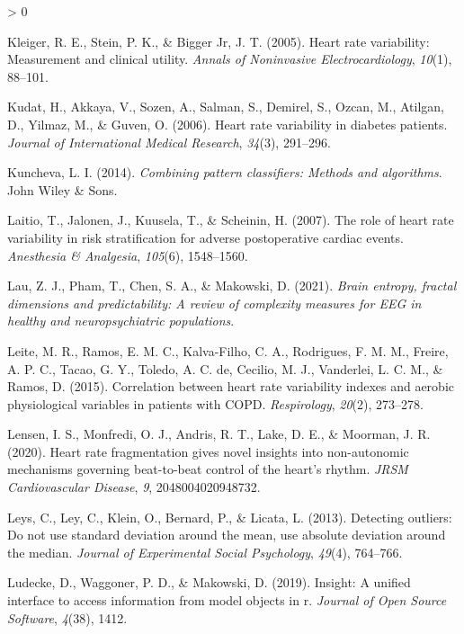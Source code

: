 \documentclass[
  english,
  jou,floatsintext]{apa6}
\newlength{\cslhangindent}
\newenvironment{CSLReferences}[2] %
 {%
  \setlength{\parindent}{0pt}
  \ifodd #1 \everypar{\setlength{\hangindent}{\cslhangindent}}\ignorespaces\fi
  \ifnum #2 > 0
  \setlength{\parskip}{#2\baselineskip}
  \fi
 }%
 {}
\begin{document}
\begin{CSLReferences}{1}{0}
\leavevmode\hypertarget{ref-kleiger2005heart}{}%
Kleiger, R. E., Stein, P. K., \& Bigger Jr, J. T. (2005). Heart rate variability: Measurement and clinical utility. \emph{Annals of Noninvasive Electrocardiology}, \emph{10}(1), 88--101.

\leavevmode\hypertarget{ref-kudat2006heart}{}%
Kudat, H., Akkaya, V., Sozen, A., Salman, S., Demirel, S., Ozcan, M., Atilgan, D., Yilmaz, M., \& Guven, O. (2006). Heart rate variability in diabetes patients. \emph{Journal of International Medical Research}, \emph{34}(3), 291--296.

\leavevmode\hypertarget{ref-kuncheva2014combining}{}%
Kuncheva, L. I. (2014). \emph{Combining pattern classifiers: Methods and algorithms}. John Wiley \& Sons.

\leavevmode\hypertarget{ref-laitio2007role}{}%
Laitio, T., Jalonen, J., Kuusela, T., \& Scheinin, H. (2007). The role of heart rate variability in risk stratification for adverse postoperative cardiac events. \emph{Anesthesia \& Analgesia}, \emph{105}(6), 1548--1560.

\leavevmode\hypertarget{ref-lau2021brain}{}%
Lau, Z. J., Pham, T., Chen, S. A., \& Makowski, D. (2021). \emph{Brain entropy, fractal dimensions and predictability: A review of complexity measures for EEG in healthy and neuropsychiatric populations}.

\leavevmode\hypertarget{ref-leite2015correlation}{}%
Leite, M. R., Ramos, E. M. C., Kalva-Filho, C. A., Rodrigues, F. M. M., Freire, A. P. C., Tacao, G. Y., Toledo, A. C. de, Cecilio, M. J., Vanderlei, L. C. M., \& Ramos, D. (2015). Correlation between heart rate variability indexes and aerobic physiological variables in patients with COPD. \emph{Respirology}, \emph{20}(2), 273--278.

\leavevmode\hypertarget{ref-lensen2020heart}{}%
Lensen, I. S., Monfredi, O. J., Andris, R. T., Lake, D. E., \& Moorman, J. R. (2020). Heart rate fragmentation gives novel insights into non-autonomic mechanisms governing beat-to-beat control of the heart's rhythm. \emph{JRSM Cardiovascular Disease}, \emph{9}, 2048004020948732.

\leavevmode\hypertarget{ref-leys2013detecting}{}%
Leys, C., Ley, C., Klein, O., Bernard, P., \& Licata, L. (2013). Detecting outliers: Do not use standard deviation around the mean, use absolute deviation around the median. \emph{Journal of Experimental Social Psychology}, \emph{49}(4), 764--766.

\leavevmode\hypertarget{ref-ludecke2019insight}{}%
Ludecke, D., Waggoner, P. D., \& Makowski, D. (2019). Insight: A unified interface to access information from model objects in r. \emph{Journal of Open Source Software}, \emph{4}(38), 1412.


\end{CSLReferences}
\end{document}
